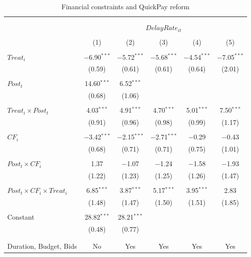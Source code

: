 \documentclass[]{article}
\begin{document}
\begin{table}[H] \centering 
  \caption{Financial constraints and QuickPay reform} 
  \label{} 
\small 
\begin{tabular}{@{\extracolsep{-2pt}}lccccc} 
\\[-1.8ex]\hline 
\hline \\[-1.8ex] 
\\[-1.8ex] & \multicolumn{5}{c}{$DelayRate_{it}$  } \\ 
\\[-1.8ex] & (1) & (2) & (3) & (4) & (5)\\ 
\hline \\[-1.8ex] 
 $Treat_i$ & $-$6.90$^{***}$ & $-$5.72$^{***}$ & $-$5.68$^{***}$ & $-$4.54$^{***}$ & $-$7.05$^{***}$ \\ 
  & (0.59) & (0.61) & (0.61) & (0.64) & (2.01) \\ 
  & & & & & \\ 
 $Post_t$ & 14.60$^{***}$ & 6.52$^{***}$ &  &  &  \\ 
  & (0.68) & (1.06) &  &  &  \\ 
  & & & & & \\ 
 $Treat_i \times Post_t$ & 4.03$^{***}$ & 4.91$^{***}$ & 4.70$^{***}$ & 5.01$^{***}$ & 7.50$^{***}$ \\ 
  & (0.91) & (0.96) & (0.98) & (0.99) & (1.17) \\ 
  & & & & & \\ 
 $CF_i$ & $-$3.42$^{***}$ & $-$2.15$^{***}$ & $-$2.71$^{***}$ & $-$0.29 & $-$0.43 \\ 
  & (0.68) & (0.71) & (0.71) & (0.75) & (1.01) \\ 
  & & & & & \\ 
 $Post_t \times CF_i$ & 1.37 & $-$1.07 & $-$1.24 & $-$1.58 & $-$1.93 \\ 
  & (1.22) & (1.23) & (1.25) & (1.26) & (1.47) \\ 
  & & & & & \\ 
 $Post_t \times CF_i \times Treat_i$ & 6.85$^{***}$ & 3.87$^{***}$ & 5.17$^{***}$ & 3.95$^{***}$ & 2.83 \\ 
  & (1.48) & (1.47) & (1.50) & (1.51) & (1.85) \\ 
  & & & & & \\ 
 Constant & 28.82$^{***}$ & 28.21$^{***}$ &  &  &  \\ 
  & (0.48) & (0.77) &  &  &  \\ 
  & & & & & \\ 
\hline \\[-1.8ex] 
Duration, Budget, Bids & No & Yes & Yes & Yes & Yes \\ 

\end{tabular}
\end{table}
\end{document}
